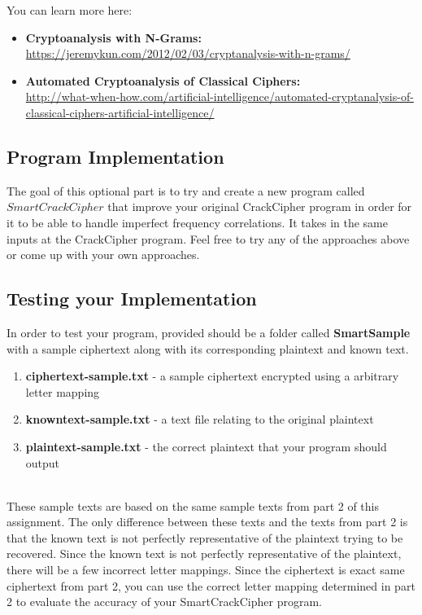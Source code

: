 \documentclass{article}
\begin{document}
\noindent You can learn more here:
\begin{itemize}
\item \textbf{Cryptoanalysis with N-Grams:}\\ \url{https://jeremykun.com/2012/02/03/cryptanalysis-with-n-grams/}
\item \textbf{Automated Cryptoanalysis of Classical Ciphers:}\\ \url{http://what-when-how.com/artificial-intelligence/automated-cryptanalysis-of-classical-ciphers-artificial-intelligence/}
\end{itemize}

\subsection{Program Implementation}
The goal of this optional part is to try and create a new program called $SmartCrackCipher$ that improve your original CrackCipher program in order for it to be able to handle imperfect frequency correlations. It takes in the same inputs at the CrackCipher program. Feel free to try any of the approaches above or come up with your own approaches.

\subsection{Testing your Implementation}
In order to test your program, provided should be a folder called \textbf{SmartSample} with a sample ciphertext along with its corresponding plaintext and known text.\\
\begin{enumerate}
\item \textbf{ciphertext-sample.txt} - a sample ciphertext encrypted using a arbitrary letter mapping
\item \textbf{knowntext-sample.txt} - a text file relating to the original plaintext
\item \textbf{plaintext-sample.txt} - the correct plaintext that your program should output
\end{enumerate}

\noindent\\ These sample texts are based on the same sample texts from part 2 of this assignment. The only difference between these texts and the texts from part 2 is that the known text is not perfectly representative of the plaintext trying to be recovered. Since the known text is not perfectly representative of the plaintext, there will be a few incorrect letter mappings. Since the ciphertext is exact same ciphertext from part 2, you can use the correct letter mapping determined in part 2 to evaluate the accuracy of your SmartCrackCipher program. \\
\end{document}
